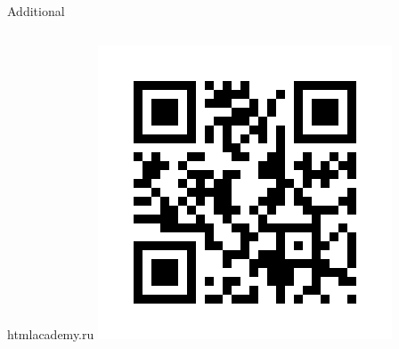 \begin{frame}{Additional}
\begin{columns}[t]
\begin{column}[T]{5cm}
\begin{center}
              htmlacademy.ru \newline
              \includegraphics[width=\textwidth]{sources/images/htmlacademy.png}
             \end{center}
         \end{column}
     \end{columns}
\end{frame}
